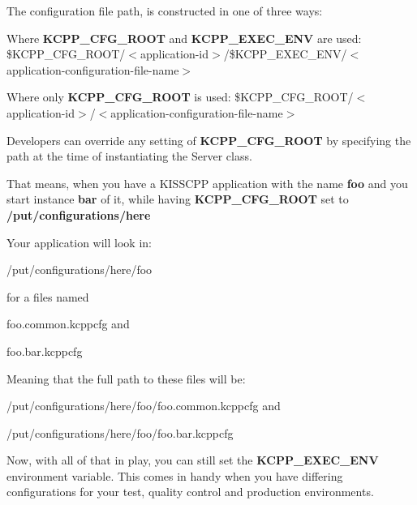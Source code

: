 The configuration file path, is constructed in one of three ways\-:


\begin{DoxyItemize}
\item Where {\bfseries K\-C\-P\-P\-\_\-\-C\-F\-G\-\_\-\-R\-O\-O\-T} and {\bfseries K\-C\-P\-P\-\_\-\-E\-X\-E\-C\-\_\-\-E\-N\-V} are used\-: \$\-K\-C\-P\-P\-\_\-\-C\-F\-G\-\_\-\-R\-O\-O\-T/$<$application-\/id$>$/\$\-K\-C\-P\-P\-\_\-\-E\-X\-E\-C\-\_\-\-E\-N\-V/$<$application-\/configuration-\/file-\/name$>$
\item Where only {\bfseries K\-C\-P\-P\-\_\-\-C\-F\-G\-\_\-\-R\-O\-O\-T} is used\-: \$\-K\-C\-P\-P\-\_\-\-C\-F\-G\-\_\-\-R\-O\-O\-T/$<$application-\/id$>$/$<$application-\/configuration-\/file-\/name$>$
\item Developers can override any setting of {\bfseries K\-C\-P\-P\-\_\-\-C\-F\-G\-\_\-\-R\-O\-O\-T} by specifying the path at the time of instantiating the Server class.
\end{DoxyItemize}

That means, when you have a K\-I\-S\-S\-C\-P\-P application with the name {\bfseries foo} and you start instance {\bfseries bar} of it, while having {\bfseries K\-C\-P\-P\-\_\-\-C\-F\-G\-\_\-\-R\-O\-O\-T} set to {\bfseries /put/configurations/here}

Your application will look in\-:
\begin{DoxyItemize}
\item /put/configurations/here/foo
\item for a files named
\begin{DoxyItemize}
\item foo.\-common.\-kcppcfg and
\item foo.\-bar.\-kcppcfg
\end{DoxyItemize}
\end{DoxyItemize}

Meaning that the full path to these files will be\-:
\begin{DoxyItemize}
\item /put/configurations/here/foo/foo.common.\-kcppcfg and
\item /put/configurations/here/foo/foo.bar.\-kcppcfg
\end{DoxyItemize}

Now, with all of that in play, you can still set the {\bfseries K\-C\-P\-P\-\_\-\-E\-X\-E\-C\-\_\-\-E\-N\-V} environment variable. This comes in handy when you have differing configurations for your test, quality control and production environments.


